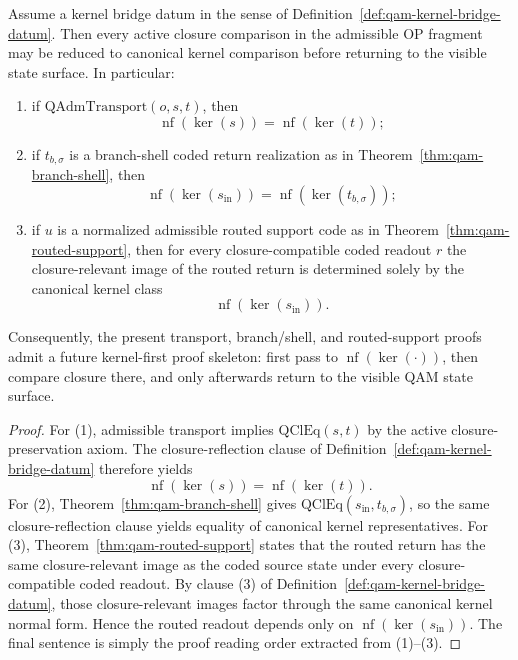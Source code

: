 \begin{theorem}\label{thm:qam-kernel-bridge}
Assume a kernel bridge datum in the sense of Definition~\ref{def:qam-kernel-bridge-datum}. Then every active closure comparison in the admissible OP fragment may be reduced to canonical kernel comparison before returning to the visible state surface. In particular:
\begin{enumerate}
\item if $\mathrm{QAdmTransport}(o,s,t)$, then
\[
\operatorname{nf}(\operatorname{ker}(s))=\operatorname{nf}(\operatorname{ker}(t));
\]
\item if $t_{b,\sigma}$ is a branch-shell coded return realization as in Theorem~\ref{thm:qam-branch-shell}, then
\[
\operatorname{nf}(\operatorname{ker}(s_{\mathrm{in}}))=\operatorname{nf}(\operatorname{ker}(t_{b,\sigma}));
\]
\item if $u$ is a normalized admissible routed support code as in Theorem~\ref{thm:qam-routed-support}, then for every closure-compatible coded readout $r$ the closure-relevant image of the routed return is determined solely by the canonical kernel class
\[
\operatorname{nf}(\operatorname{ker}(s_{\mathrm{in}})).
\]
\end{enumerate}
Consequently, the present transport, branch/shell, and routed-support proofs admit a future kernel-first proof skeleton: first pass to $\operatorname{nf}(\operatorname{ker}(\cdot))$, then compare closure there, and only afterwards return to the visible QAM state surface.
\end{theorem}

\begin{proof}
For (1), admissible transport implies $\mathrm{QClEq}(s,t)$ by the active closure-preservation axiom. The closure-reflection clause of Definition~\ref{def:qam-kernel-bridge-datum} therefore yields
\[
\operatorname{nf}(\operatorname{ker}(s))=\operatorname{nf}(\operatorname{ker}(t)).
\]
For (2), Theorem~\ref{thm:qam-branch-shell} gives $\mathrm{QClEq}(s_{\mathrm{in}},t_{b,\sigma})$, so the same closure-reflection clause yields equality of canonical kernel representatives. For (3), Theorem~\ref{thm:qam-routed-support} states that the routed return has the same closure-relevant image as the coded source state under every closure-compatible coded readout. By clause (3) of Definition~\ref{def:qam-kernel-bridge-datum}, those closure-relevant images factor through the same canonical kernel normal form. Hence the routed readout depends only on $\operatorname{nf}(\operatorname{ker}(s_{\mathrm{in}}))$. The final sentence is simply the proof reading order extracted from (1)--(3).
\end{proof}

